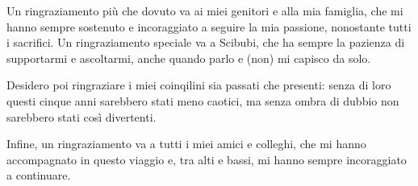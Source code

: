 \documentclass{Configuration_Files/PoliMi3i_thesis}
\theoremstyle{definition}
\theoremstyle{remark}
\begin{document}
Un ringraziamento più che dovuto va ai miei genitori e alla mia famiglia, che mi hanno sempre
sostenuto e incoraggiato a seguire la mia passione, nonostante tutti i sacrifici.
Un ringraziamento speciale va a Scibubi, che ha sempre la pazienza di supportarmi e 
ascoltarmi, anche quando parlo e (non) mi capisco da solo.

Desidero poi ringraziare i miei coinqilini sia passati che presenti: senza di loro questi cinque
anni sarebbero stati meno caotici, ma senza ombra di dubbio non sarebbero stati così divertenti.

Infine, un ringraziamento va a tutti i miei amici e colleghi, che mi hanno accompagnato in questo 
viaggio e, tra alti e bassi, mi hanno sempre incoraggiato a continuare.

\cleardoublepage
\end{document}
